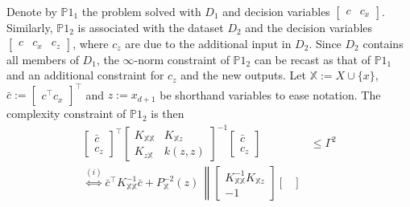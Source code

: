 \begin{my_proof}
	Denote by $\mathds{P}1_1$ the problem solved with $D_1$ and decision variables $\begin{bmatrix} c & c_x \end{bmatrix}$. Similarly, $\mathds{P}1_2$ is associated with the dataset $D_2$ and the decision variables $\begin{bmatrix} c & c_x & c_z \end{bmatrix}$, where $c_z$ are due to the additional input in $D_2$. Since $D_2$ contains all members of $D_1$, the $\infty$-norm constraint of $\mathds{P}1_2$ can be recast as that of $\mathds{P}1_1$ and an additional constraint for $c_z$ and the new outputs. Let $\mathds{X}  := X \cup \{x\}$, $\bar c := \begin{bmatrix} c^\top c_x \end{bmatrix}^\top$ and $z := x_{d+1}$ be shorthand variables to ease notation. The complexity constraint of $\mathds{P}1_2$ is then
	\begin{subequations}
		\begin{align}
			\begin{bmatrix}
				\bar c \\
				c_z
			\end{bmatrix}^\top 
			\begin{bmatrix}
				K_{\mathds{X} \mathds{X} } & K_{\mathds{X}  z} \\
				K_{z \mathds{X} } & k(z,z)
			\end{bmatrix}^{-1} 
			\begin{bmatrix}
				\bar c \\
				c_z
			\end{bmatrix} & \leq \Gamma^2 \\
			\overset{(i)}{\Leftrightarrow}
			\bar c^\top K_{\mathds{X} \mathds{X} }^{-1} \bar c +
			P_{\mathds{X} }^{-2}(z) \, 
			\left\|
			\begin{bmatrix}
				K_{\mathds{X} \mathds{X} }^{-1} K_{\mathds{X} z} \\
				-1
			\end{bmatrix}
			\begin{bmatrix}

\end{bmatrix}
\end{align}
\end{subequations}
\end{my_proof}
